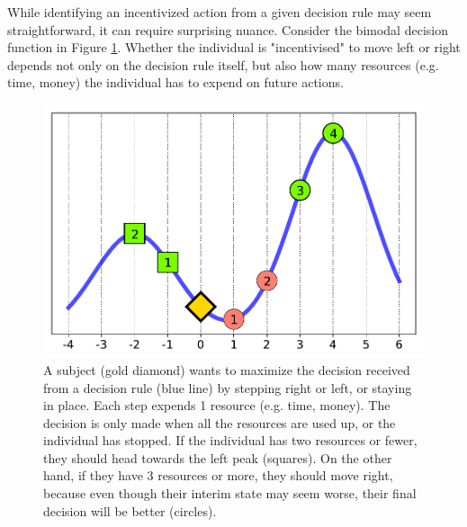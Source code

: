 While identifying an incentivized action from a given decision rule may seem straightforward, it can require surprising nuance. Consider the bimodal decision function in Figure \ref{fig:1di}. Whether the individual is "incentivised" to move left or right depends not only on the decision rule itself, but also how many resources (e.g. time, money) the individual has to expend on future actions.
\begin{figure}
    \centering
{}
\includegraphics[width=\linewidth]{figures/incentive_1d.pdf}
\endminipage\hfill
{}
    \caption{A subject (gold diamond) wants to maximize the decision received from a decision rule (blue line) by stepping right or left, or staying in place. Each step expends 1 resource (e.g. time, money). The decision is only made when all the resources are used up, or the individual has stopped. If the individual has two resources or fewer, they should head towards the left peak (squares). On the other hand, if they have 3 resources or more, they should move right, because even though their interim state may seem worse, their final decision will be better (circles).}
\endminipage

    \label{fig:1di}
\end{figure}


